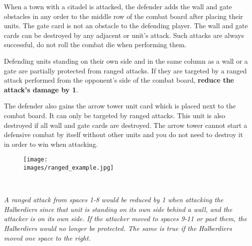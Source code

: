 \documentclass[12pt]{article}
\def\assets{assets}
\def\images{\assets/images}
\def\svgs{\assets/svgs}
\begin{document}
When a town with a citadel is attacked, the defender adds the wall and gate obstacles in any order to the middle row of the combat board after placing their units. The gate card is not an obstacle to the defending player. The wall and gate cards can be destroyed by any adjacent  or  unit's attack. Such attacks are always successful, do not roll the combat die when performing them.\par
Defending units standing on their own side and in the same column as a wall or a gate are partially protected from ranged attacks. If they are targeted by a ranged attack performed from the opponent's side of the combat board, \textbf{reduce the attack's damage by 1}.
\par
The defender also gains the arrow tower unit card which is placed next to the combat board. It can only be targeted by ranged attacks. This unit is also destroyed if all wall and gate cards are destroyed. The arrow tower cannot start a defensive combat by itself without other units and you do not need to destroy it in order to win when attacking.
\begin{figure}[h]
\centering
\texttt{[image: \\images/ranged\_example.jpg]}
\end{figure}\\
\begin{center}
\textit{A ranged attack from spaces 1-8 would be reduced by 1 when attacking the Halberdiers since that unit is standing on its own side behind a wall, and the attacker is on its own side. If the attacker moved to spaces 9-11 or past them, the Halberdiers would no longer be protected. The same is true if the Halberdiers moved one space to the right.}
\end{center}

\clearpage
\end{document}
